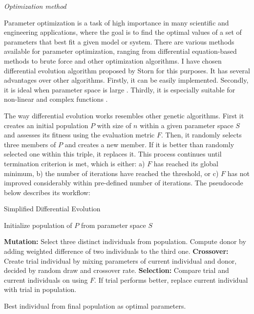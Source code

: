 \documentclass[a4paper,12pt]{article}
\newcommand{\citeyearonly}[1]{\citeyearpar{#1}}
\begin{document}
\textit{Optimization method}

Parameter optimization is a task of high importance in many scientific and engineering applications, where the goal is to find the optimal values of a set of parameters that best fit a given model or system. There are various methods available for parameter optimization, ranging from differential equation-based methods to brute force and other optimization algorithms. I have chosen differential evolution algorithm proposed by Storn \citeyearonly{storn1997differential} for this purposes. It has several advantages over other algorithms. Firstly, it can be easily implemented. Secondly, it is ideal when parameter space is large \citep{lin2019applying}. Thirdly, it is  especially suitable for non-linear and complex functions \citep{omran2009bare}. 

The way differential evolution works resembles other genetic algorithms. First it creates an initial population $P$ with size of $n$ within a given parameter space $S$ and assesses its fitness using the evaluation metric $F$. Then, it randomly selects three members of $P$ and creates a new member. If it is better than randomly selected one within this triple, it replaces it. This process continues until termination criterion is met, which is either: a) $F$ has reached its global minimum, b) the number of iterations have reached the threshold, or c) $F$ has not improved considerably within pre-defined number of iterations. The pseudocode below describes its workflow:

\begin{algorithm}
\caption{Simplified Differential Evolution}
\begin{algorithmic}[1]

\State Initialize population of $P$ from parameter space $S$

        \State \textbf{Mutation:} Select three distinct individuals from population. Compute donor by adding weighted difference of two individuals to the third one.
        \State \textbf{Crossover:} Create trial individual by mixing parameters of current individual and donor, decided by random draw and crossover rate.
        \State \textbf{Selection:} Compare trial and current individuals on using $F$. If trial performs better, replace current individual with trial in population.
    \EndFor
\EndWhile

\State \Return Best individual from final population as optimal parameters.

\end{algorithmic}
\end{algorithm}
\end{document}
